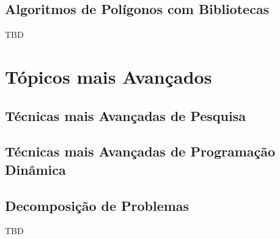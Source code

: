 \documentclass[11pt]{scrartcl}
\begin{document}
\subsection{Algoritmos de Polígonos com Bibliotecas}

TBD


\section{Tópicos mais Avançados}

\subsection{Técnicas mais Avançadas de Pesquisa}

\subsection{Técnicas mais Avançadas de Programação Dinâmica}

\subsection{Decomposição de Problemas}

TBD
\end{document}
